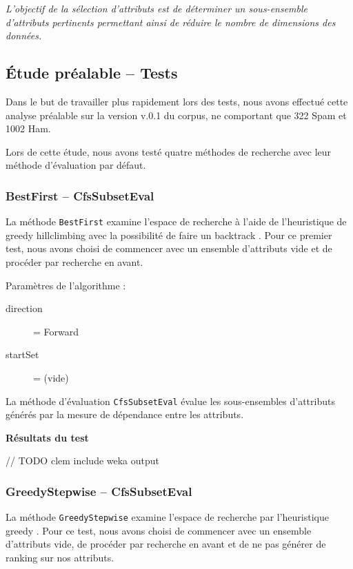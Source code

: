 \label{partieA3}
\textit{L'objectif de la sélection d'attributs est de déterminer un sous-ensemble d'attributs pertinents permettant ainsi de réduire le nombre de dimensions des données.}

\subsection{Étude préalable -- Tests}

Dans le but de travailler plus rapidement lors des tests, nous avons effectué cette analyse préalable sur la version v.0.1 du corpus, ne comportant que 322 Spam et 1002 Ham.

Lors de cette étude, nous avons testé quatre méthodes de recherche avec leur méthode d'évaluation par défaut.

\subsubsection{BestFirst -- CfsSubsetEval}

La méthode \texttt{BestFirst} examine l'espace de recherche à l'aide de l'heuristique de \og greedy hillclimbing \fg{} avec la possibilité de faire un  \og backtrack \fg{}.  Pour ce premier test, nous avons choisi de commencer avec un ensemble d'attributs vide et de procéder par recherche en avant.

Paramètres de l'algorithme : 
\begin{description}
	\item[direction] = Forward
	\item[startSet] = (vide)
\end{description}

La méthode d'évaluation \texttt{CfsSubsetEval} évalue les sous-ensembles d'attributs générés par la mesure de dépendance entre les attributs.

\textbf{Résultats du test}

// TODO clem include weka output

\subsubsection{GreedyStepwise -- CfsSubsetEval}

La méthode \texttt{GreedyStepwise} examine l'espace de recherche par l'heuristique \og greedy \fg{}. Pour ce test, nous avons choisi de commencer avec un ensemble d'attributs vide, de procéder par recherche en avant et de ne pas générer de \og ranking \fg{} sur nos attributs.

